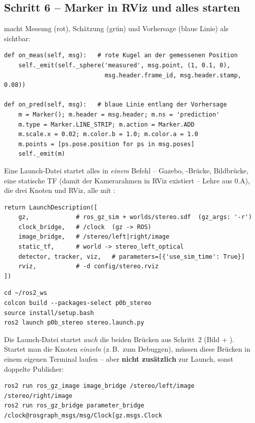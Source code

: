 \subsection{Schritt 6 -- Marker in RViz und alles starten}
 macht Messung (rot), Schätzung (grün) und Vorhersage (blaue
Linie) als  sichtbar:
\begin{lstlisting}[style=py,caption={\code{p0b\_stereo/marker\_viz.py} (Kern)}]
def on_meas(self, msg):   # rote Kugel an der gemessenen Position
    self._emit(self._sphere('measured', msg.point, (1, 0.1, 0),
                            msg.header.frame_id, msg.header.stamp, 0.08))

def on_pred(self, msg):   # blaue Linie entlang der Vorhersage
    m = Marker(); m.header = msg.header; m.ns = 'prediction'
    m.type = Marker.LINE_STRIP; m.action = Marker.ADD
    m.scale.x = 0.02; m.color.b = 1.0; m.color.a = 1.0
    m.points = [ps.pose.position for ps in msg.poses]
    self._emit(m)
\end{lstlisting}
\noindent Eine Launch-Datei startet alles in \emph{einem} Befehl -- Gazebo,
-Brücke, Bildbrücke, eine statische TF (damit der Kamerarahmen in
RViz existiert -- Lehre aus 0.A), die drei Knoten und RViz, alle mit
:
\begin{lstlisting}[style=py,caption={\code{launch/stereo.launch.py} (Knotenliste)}]
return LaunchDescription([
    gz,             # ros_gz_sim + worlds/stereo.sdf  (gz_args: '-r')
    clock_bridge,   # /clock  (gz -> ROS)
    image_bridge,   # /stereo/left|right/image
    static_tf,      # world -> stereo_left_optical
    detector, tracker, viz,   # parameters=[{'use_sim_time': True}]
    rviz,           # -d config/stereo.rviz
])
\end{lstlisting}
\begin{lstlisting}[style=bash,caption={Terminal 1 -- bauen, sourcen, alles starten}]
cd ~/ros2_ws
colcon build --packages-select p0b_stereo
source install/setup.bash
ros2 launch p0b_stereo stereo.launch.py
\end{lstlisting}
\noindent Die Launch-Datei startet \emph{auch} die beiden Brücken aus Schritt~2
(Bild + ). Startet man die Knoten \emph{einzeln} (z.\,B.\ zum
Debuggen), müssen diese Brücken in einem eigenen Terminal laufen -- aber
\textbf{nicht zusätzlich} zur Launch, sonst doppelte Publisher:
\begin{lstlisting}[style=bash,caption={Brücken (nur bei manuellem Start nötig)}]
ros2 run ros_gz_image image_bridge /stereo/left/image /stereo/right/image
ros2 run ros_gz_bridge parameter_bridge /clock@rosgraph_msgs/msg/Clock[gz.msgs.Clock
\end{lstlisting}
